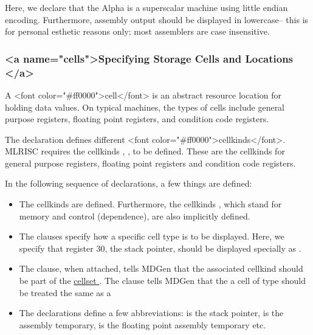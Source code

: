 Here, we declare that the Alpha is a superscalar machine using
little endian encoding.  Furthermore, assembly output should be displayed
in lowercase-- this is for personal esthetic reasons only; most assemblers
are case insensitive.



\subsubsection{ <a name="cells">Specifying Storage Cells and Locations </a>}

A <font color="#ff0000">cell</font> is an abstract resource location 
for holding data values.  On typical machines, the types of
cells include general purpose registers, floating point registers,
and condition code registers.

The  declaration defines different 
<font color="#ff0000">cellkinds</font>.  MLRISC requires the
cellkinds , ,  to be defined.
These are the cellkinds for general purpose registers, floating point
registers and condition code registers.

In the following sequence of declarations, a few things are defined:
\begin{itemize}
  \item The cellkinds  are defined.
        Furthermore, the cellkinds , which stand
        for memory and control (dependence), are also implicitly defined.
  \item The  clauses specify how a specific cell type is
       to be displayed.    Here, we specify that register 30, the
       stack pointer, should be displayed specially as .
  \item The  clause, when attached, tells MDGen that
       the associated cellkind should be part of the 
       \href{cellset.html}{ cellset }.  The clause 
       tells MDGen that the a cell of type  should be treated
       the same as a 
  \item The  declarations define a few abbreviations:
         is the stack pointer,  is
       the assembly temporary,  is the floating point
       assembly temporary etc.
\end{itemize}

